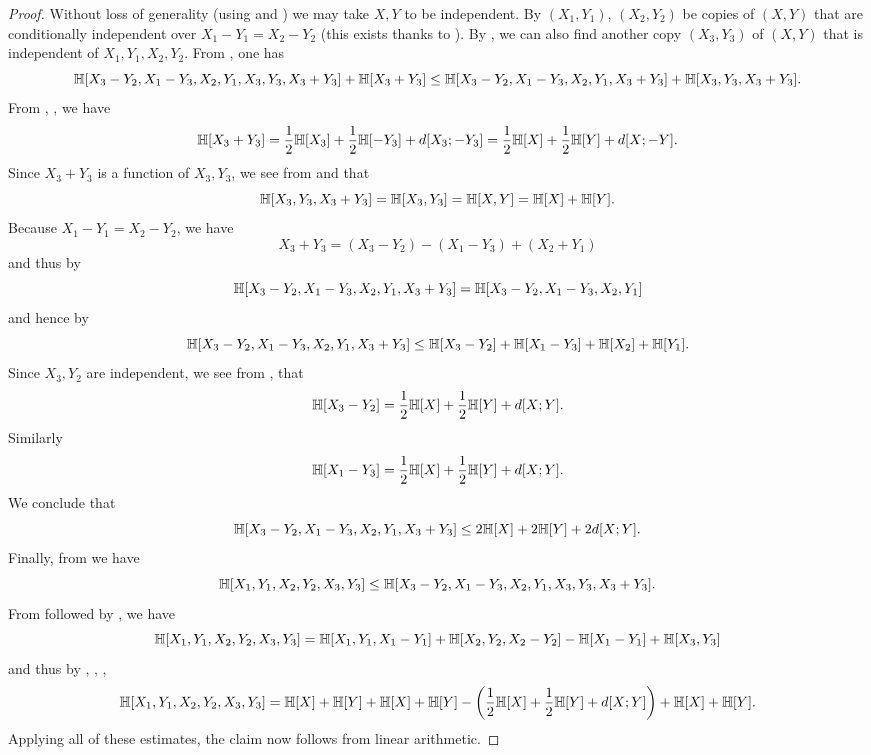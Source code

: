 \begin{proof}\leanok
Without loss of generality (using  and ) we may take $X,Y$ to be independent.
By $(X_1,Y_1)$, $(X_2,Y_2)$ be copies of $(X,Y)$ that are conditionally independent over $X_1-Y_1=X_2-Y_2$ (this exists thanks to ).  By , we can also find another copy $(X_3,Y_3)$ of $(X,Y)$ that is independent of $X_1,Y_1,X_2,Y_2$.  From , one has
$$ \mathbb{H}[X_3-Y_2, X_1-Y_3, X_2, Y_1, X_3, Y_3, X_3+Y_3] + \mathbb{H}[X_3+Y_3] \leq \mathbb{H}[X_3-Y_2, X_1-Y_3, X_2, Y_1, X_3+Y_3] + \mathbb{H}[X_3, Y_3, X_3+Y_3].$$
From , ,  we have
$$ \mathbb{H}[X_3+Y_3] = \frac{1}{2} \mathbb{H}[X_3] + \frac{1}{2} \mathbb{H}[-Y_3] + d[X_3;-Y_3] = \frac{1}{2} \mathbb{H}[X] + \frac{1}{2} \mathbb{H}[Y] + d[X;-Y].$$
Since $X_3+Y_3$ is a function of $X_3,Y_3$, we see from  and  that
$$ \mathbb{H}[X_3,Y_3,X_3+Y_3] = \mathbb{H}[X_3,Y_3] = \mathbb{H}[X,Y] = \mathbb{H}[X]+\mathbb{H}[Y].$$
Because $X_1-Y_1=X_2-Y_2$, we have
$$ X_3+Y_3 = (X_3-Y_2) - (X_1-Y_3) + (X_2+Y_1)$$
and thus by 
$$ \mathbb{H}[X_3-Y_2, X_1-Y_3, X_2, Y_1, X_3+Y_3] = \mathbb{H}[X_3-Y_2, X_1-Y_3, X_2, Y_1]$$
and hence by 
$$ \mathbb{H}[X_3-Y_2, X_1-Y_3, X_2, Y_1, X_3+Y_3] \leq \mathbb{H}[X_3-Y_2] + \mathbb{H}[X_1-Y_3] + \mathbb{H}[X_2] + \mathbb{H}[Y_1].$$
Since $X_3,Y_2$ are independent, we see from ,  that
$$\mathbb{H}[X_3-Y_2] = \frac{1}{2} \mathbb{H}[X] + \frac{1}{2} \mathbb{H}[Y] + d[X; Y].$$
Similarly
$$ \mathbb{H}[X_1-Y_3] = \frac{1}{2} \mathbb{H}[X] + \frac{1}{2} \mathbb{H}[Y] + d[X; Y].$$
We conclude that
$$ \mathbb{H}[X_3-Y_2, X_1-Y_3, X_2, Y_1, X_3+Y_3] \leq 2\mathbb{H}[X] + 2\mathbb{H}[Y] + 2d[X; Y].$$
Finally, from  we have
$$ \mathbb{H}[X_1,Y_1,X_2,Y_2,X_3,Y_3] \leq \mathbb{H}[X_3-Y_2, X_1-Y_3, X_2, Y_1, X_3, Y_3, X_3+Y_3].$$
From  followed by , we have
$$\mathbb{H}[X_1,Y_1,X_2,Y_2,X_3,Y_3] = \mathbb{H}[X_1,Y_1,X_1-Y_1] + \mathbb{H}[X_2,Y_2,X_2-Y_2] - \mathbb{H}[X_1-Y_1] + \mathbb{H}[X_3,Y_3]$$
and thus by , , , 
$$\mathbb{H}[X_1,Y_1,X_2,Y_2,X_3,Y_3] = \mathbb{H}[X] + \mathbb{H}[Y] + \mathbb{H}[X] + \mathbb{H}[Y] -\left(\frac{1}{2}\mathbb{H}[X] + \frac{1}{2}\mathbb{H}[Y] + d[X; Y]\right) + \mathbb{H}[X] + \mathbb{H}[Y].$$
Applying all of these estimates, the claim now follows from linear arithmetic.
\end{proof}

